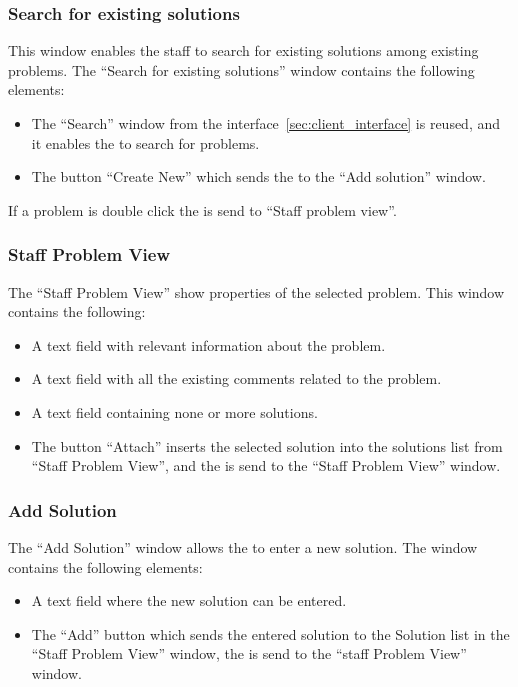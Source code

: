 \subsubsection{Search for existing solutions}
This window enables the staff to search for existing solutions among existing problems. The ``Search for existing solutions'' window contains the following elements:
\begin{itemize}
	\item The ``Search'' window from the \aclient[] interface~\ref{sec:client_interface} is reused, and it enables the \astaff[] to search for problems.
	\item The button ``Create New'' which sends the \astaff to the ``Add solution'' window.
\end{itemize} 
If a problem is double click the \astaff[] is send to ``Staff problem view''.

\subsubsection{Staff Problem View}
The ``Staff Problem View'' show properties of the selected problem. This window contains the following:
\begin{itemize}
	\item A text field with relevant information about the problem.
	\item A text field with all the existing comments related to the problem.
	\item A text field containing none or more solutions.
	\item The button ``Attach'' inserts the selected solution into the solutions list from ``Staff Problem View'', and the \astaff[] is send to the ``Staff Problem View'' window.
\end{itemize}

\subsubsection{Add Solution}
The ``Add Solution'' window allows the \staff[] to enter a new solution. The window contains the following elements:
\begin{itemize}
	\item A text field where the new solution can be entered.
	\item The ``Add'' button which sends the entered solution to the Solution list in the ``Staff Problem View'' window, the \astaff is send to the ``staff Problem View'' window.
\end{itemize}
 



